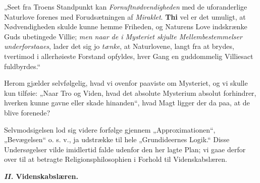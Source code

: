 \documentclass[12pt,a4paper]{book}
\newcommand{\opage}[1]{\marginnote{\footnotesize\textit{[#1]}}}
\begin{document}
„Seet fra Troens Standpunkt kan \emph{Fornuftnødvendigheden}
med de uforanderlige Naturlove forenes
\opage{20}\setcounter{footnote}{0}%
med Forudsætningen af \emph{Miraklet}. \textbf{Thi} vel er det
umuligt, at Nødvendigheden skulde kunne hemme Friheden,
og Naturens Love indskrænke Guds ubetingede
Villie; \emph{men naar de i Mysteriet skjulte Mellembestemmelser
underforstaaes}, lader det sig
jo \emph{tænke}, at Naturlovene, langt fra at brydes, tvertimod
i allerhøieste Forstand opfyldes, hver Gang en
guddommelig Villiesact fuldbyrdes.“

Herom gjælder selvfølgelig, hvad vi ovenfor paaviste
om Mysteriet, og vi skulle kun tilføie: „Naar Tro
og Viden, hvad det absolute Mysterium absolut forhindrer,
hverken kunne gavne eller skade hinanden“, hvad
Magt ligger der da paa, at de blive forenede?

Selvmodsigelsen lod sig videre forfølge gjennem „Approximationen“,
„Bevægelsen“ o. s. v., ja udstrække til
hele „Grundideernes Logik.“ Disse Undersøgelser vilde
imidlertid falde udenfor den her lagte Plan; vi gaae
derfor over til at betragte Religionsphilosophien i Forhold
til Videnskabslæren.

\begin{center}\textbf{\textit{II.} Videnskabslæren.}\end{center}
\end{document}
